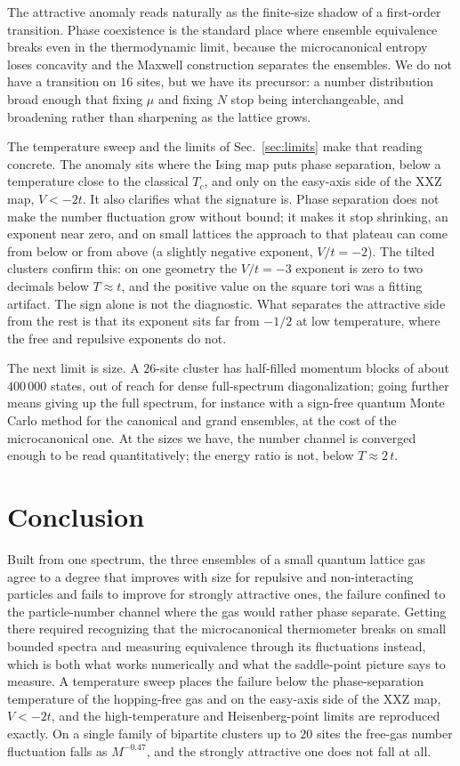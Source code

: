 \documentclass[twocolumn,10pt]{article}
\begin{document}
The attractive anomaly reads naturally as the finite-size shadow of a first-order
transition. Phase coexistence is the standard place where ensemble equivalence
breaks even in the thermodynamic limit, because the microcanonical entropy loses
concavity and the Maxwell construction separates the ensembles. We do not have a
transition on $16$ sites, but we have its precursor: a number distribution broad
enough that fixing $\mu$ and fixing $N$ stop being interchangeable, and broadening
rather than sharpening as the lattice grows.

The temperature sweep and the limits of Sec.~\ref{sec:limits} make that reading
concrete. The anomaly sits where the Ising map puts phase separation, below a
temperature close to the classical $T_c$, and only on the easy-axis side of the
XXZ map, $V<-2t$. It also clarifies what the signature is. Phase separation
does not make the number fluctuation grow without bound; it makes it stop
shrinking, an exponent near zero, and on small lattices the approach to that
plateau can come from below or from above (a slightly negative exponent,
$V/t=-2$). The tilted clusters confirm this: on one geometry the $V/t=-3$
exponent is zero to two decimals below $T\approx t$, and the positive value on
the square tori was a fitting artifact. The sign alone is not the diagnostic.
What separates the attractive side from the rest is that its exponent sits far
from $-1/2$ at low temperature, where the free and repulsive exponents do not.

The next limit is size. A $26$-site cluster has half-filled momentum blocks of
about $400\,000$ states, out of reach for dense full-spectrum diagonalization;
going further means giving up the full spectrum, for instance with a
sign-free quantum Monte Carlo method for the canonical and grand ensembles, at
the cost of the microcanonical one. At the sizes we have, the number channel is
converged enough to be read quantitatively; the energy ratio is not, below
$T\approx2\,t$.

\section{Conclusion}
Built from one spectrum, the three ensembles of a small quantum lattice gas agree
to a degree that improves with size for repulsive and non-interacting particles
and fails to improve for strongly attractive ones, the failure
confined to the particle-number channel where the gas would rather phase separate.
Getting there required recognizing that the microcanonical thermometer breaks on
small bounded spectra and measuring equivalence through its fluctuations instead,
which is both what works numerically and what the saddle-point picture says to
measure. A temperature sweep places the failure below the phase-separation
temperature of the hopping-free gas and on the easy-axis side of the XXZ map,
$V<-2t$, and the high-temperature and Heisenberg-point limits are reproduced
exactly. On a single family of bipartite clusters up to $20$ sites the free-gas
number fluctuation falls as $M^{-0.47}$, and the strongly attractive one does not
fall at all.
\end{document}
